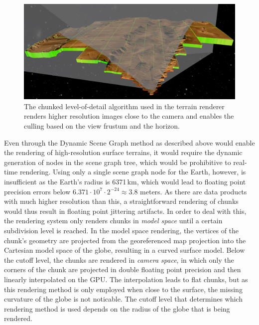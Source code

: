 \begin{figure}
\centering
\includegraphics[width=\textwidth]{figures/contributions/gb/culling.png}
\caption{The chunked level-of-detail algorithm used in the terrain renderer renders higher resolution images close to the camera and enables the culling based on the view frustum and the horizon.}
\label{contributions:astro:gb:culling}
\end{figure}

Even through the Dynamic Scene Graph method as described above would enable the rendering of high-resolution surface terrains, it would require the dynamic generation of nodes in the scene graph tree, which would be prohibitive to real-time rendering.  Using only a single scene graph node for the Earth, however, is insufficient as the Earth's radius is 6371\,km, which would lead to floating point precision errors below $6.371\cdot 10^7 \cdot 2^{-24} \approx 3.8$ meters.  As there are data products with much higher resolution than this, a straightforward rendering of chunks would thus result in floating point jittering artifacts.  In order to deal with this, the rendering system only renders chunks in \emph{model space} until a certain subdivision level is reached.  In the model space rendering, the vertices of the chunk's geometry are projected from the georeferenced map projection into the Cartesian model space of the globe, resulting in a curved surface model.  Below the cutoff level, the chunks are rendered in \emph{camera space}, in which only the corners of the chunk are projected in double floating point precision and then linearly interpolated on the GPU.  The interpolation leads to flat chunks, but as this rendering method is only employed when close to the surface, the missing curvature of the globe is not noticable.  The cutoff level that determines which rendering method is used depends on the radius of the globe that is being rendered.





